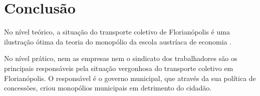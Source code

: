 \section{Conclusão}

No nível teórico, a situação do transporte coletivo de Florianópolis
é uma ilustração ótima da teoria do monopólio da escola austríaca de
economia \cite{monopoly-mes}.

No nível prático, nem as empresas nem o sindicato dos trabalhadores
são os principais responsáveis pela situação vergonhosa do transporte
coletivo em Florianópolis. O responsável é o governo municipal, que
através da sua política de concessões, criou monopólios municipais em
detrimento do cidadão.
